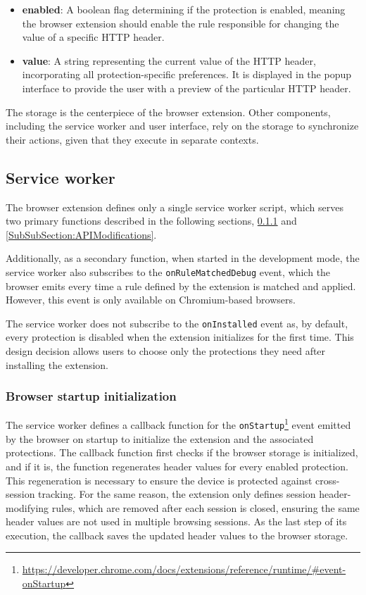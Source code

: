 \begin{itemize}
	\item \textbf{enabled}: A boolean flag determining if the protection is enabled, meaning the browser extension should enable the rule responsible for changing the value of a specific HTTP header.
	\item \textbf{value}: A string representing the current value of the HTTP header, incorporating all protection-specific preferences. It is displayed in the popup interface to provide the user with a preview of the particular HTTP header.
\end{itemize}

The storage is the centerpiece of the browser extension. Other components, including the service worker and user interface, rely on the storage to synchronize their actions, given that they execute in separate contexts.

\subsection{Service worker}

The browser extension defines only a single service worker script, which serves two primary functions described in the following sections, \ref{SubSubSection:StartupInitialization} and \ref{SubSubSection:APIModifications}.

Additionally, as a secondary function, when started in the development mode, the service worker also subscribes to the \texttt{onRuleMatchedDebug} event, which the browser emits every time a rule defined by the extension is matched and applied. However, this event is only available on Chromium-based browsers.

The service worker does not subscribe to the \texttt{onInstalled} event as, by default, every protection is disabled when the extension initializes for the first time. This design decision allows users to choose only the protections they need after installing the extension.

\subsubsection{Browser startup initialization}
\label{SubSubSection:StartupInitialization}

The service worker defines a callback function for the \texttt{onStartup}\footnote{\url{https://developer.chrome.com/docs/extensions/reference/runtime/\#event-onStartup}} event emitted by the browser on startup to initialize the extension and the associated protections. The callback function first checks if the browser storage is initialized, and if it is, the function regenerates header values for every enabled protection. This regeneration is necessary to ensure the device is protected against cross-session tracking. For the same reason, the extension only defines session header-modifying rules, which are removed after each session is closed, ensuring the same header values are not used in multiple browsing sessions. As the last step of its execution, the callback saves the updated header values to the browser storage.

